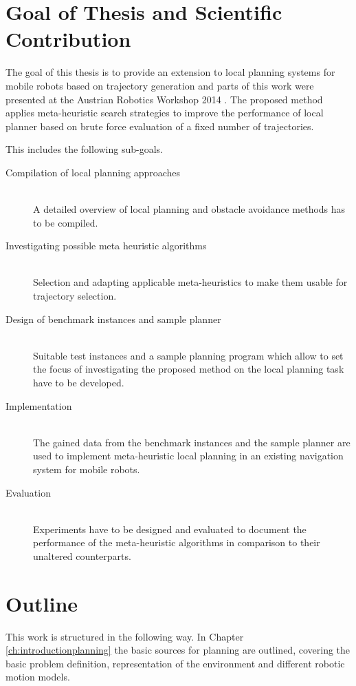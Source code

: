 \section{Goal of Thesis and Scientific Contribution}\label{sec:goal}
The goal of this thesis is to provide an extension to local planning systems for mobile robots based on trajectory generation and parts of this work were presented at the Austrian Robotics Workshop 2014 \cite{myself}. 
The proposed method applies meta-heuristic search strategies to improve the performance of local planner based on brute force evaluation of a fixed number of trajectories.

This includes the following sub-goals.
\begin{description}
\item[Compilation of local planning approaches]\hfill \\
A detailed overview of local planning and obstacle avoidance methods has to be compiled. 
\item[Investigating possible meta heuristic algorithms]\hfill \\
Selection and adapting applicable meta-heuristics to make them usable for trajectory selection.
\item[Design of benchmark instances and sample planner]\hfill \\
Suitable test instances and a sample planning program which allow to set the focus of investigating the proposed method on the local planning task have to be developed.  
\item[Implementation]\hfill \\
The gained data from the benchmark instances and the sample planner are used to implement meta-heuristic local planning in an existing navigation system for mobile robots.  
\item[Evaluation]\hfill \\
Experiments have to be designed and evaluated to document the performance of the meta-heuristic algorithms in comparison to their unaltered counterparts.
\end{description}

\section{Outline}\label{sec:outline}
This work is structured in the following way. 
In Chapter \ref{ch:introductionplanning} the basic sources for planning are outlined, covering the basic problem definition, representation of the environment and different robotic motion models. 

